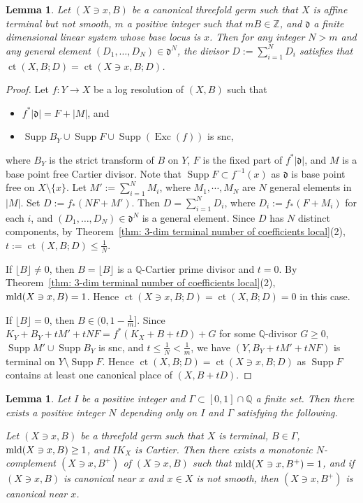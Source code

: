\documentclass[11pt]{amsart}
\numberwithin{equation}{section}
\newcommand{\Qq}{\mathbb{Q}}
\newcommand{\Zz}{\mathbb{Z}}
\newcommand{\Exc}{\operatorname{Exc}}
\newcommand{\mld}{{\rm{mld}}}
\newcommand{\ct}{\operatorname{ct}}
\newcommand{\Supp}{\operatorname{Supp}}
\newcommand{\Ii}{{\Gamma}}
\newtheorem{lem}[thm]{Lemma}
\theoremstyle{definition}
\theoremstyle{definition}
\begin{document}
\begin{lem}\label{lem: ct is attained by elephant at x}
Let $(X\ni x,B)$ be a canonical threefold germ such that $X$ is affine terminal but not smooth, $m$ a positive integer such that $mB\in \Zz$, and $\mathfrak{d}$ a finite dimensional linear system whose base locus is $x$. Then for any integer $N>m$ and any general element $(D_1,\dots,D_N)\in \mathfrak{d}^N$, the divisor $D:=\sum_{i=1}^N D_i$ satisfies that $\ct(X,B;D)=\ct(X\ni x, B;D)$.
\end{lem}

\begin{proof}
Let $f:Y\to X$ be a log resolution of $(X,B)$ such that
\begin{itemize}
    \item $f^{*}|{{\mathfrak {d}}}|=F+|M|$, and
    \item $\Supp B_Y\cup \Supp F\cup \Supp(\Exc(f))$ is snc,
\end{itemize}
where $B_Y$ is the strict transform of $B$ on $Y$, $F$ is the fixed part of $f^{*}|{{\mathfrak {d}}}|$, and $M$ is a base point free Cartier divisor. Note that $\Supp F\subset f^{-1}(x)$ as ${{\mathfrak {d}}}$ is base point free on $X\setminus\{x\}$. Let $M':=\sum_{i=1}^N M_i$, where $M_1,\cdots,M_N$ are $N$ general elements in $|M|$. Set $D:=f_{*}(NF+M')$. Then $D=\sum_{i=1}^N D_i$, where $D_i:=f_*(F+M_i)$ for each $i$, and $(D_1,\dots,D_N)\in \mathfrak{d}^N$ is a general element. Since $D$ has $N$ distinct components, by Theorem~\ref{thm: 3-dim terminal number of coefficients local}(2), $t:=\ct(X,B;D)\leq \frac{1}{N}$.

If $\lfloor B\rfloor\neq 0$, then $B=\lfloor B\rfloor$ is a $\Qq$-Cartier prime divisor and $t=0$. By Theorem~\ref{thm: 3-dim terminal number of coefficients local}(2), $\mld(X\ni x, B)=1$. Hence $\ct(X\ni x, B;D)=\ct(X,B;D)=0$ in this case.

If $\lfloor B\rfloor= 0$, then $B\in (0,1-\frac{1}{m}]$. Since $K_Y+B_Y+tM'+tNF=f^*(K_X+B+tD)+G$ for some $\Qq$-divisor $G\geq 0$, $\Supp M' \cup \Supp B_Y$ is snc, and $t\leq \frac{1}{N}<\frac{1}{m}$, we have $(Y,B_Y+tM'+tNF)$ is terminal on $Y\setminus\Supp F$. Hence $\ct(X,B;D)=\ct(X\ni x, B;D)$ as $\Supp F$ contains at least one canonical place of $(X,B+tD)$.
\end{proof}



\begin{lem}\label{lem: bounded index strict canonical complement}
Let $I$ be a positive integer and $\Gamma\subset [0,1]\cap \Qq$ a finite set. Then there exists a positive integer $N$ depending only on $I$ and $\Ii$ satisfying the following.

Let $(X\ni x,B)$ be a threefold germ such that $X$ is terminal, $B\in \Ii$, $\mld(X\ni x, B)\geq 1$, and $IK_X$ is Cartier. Then there exists a monotonic $N$-complement $(X\ni x, B^+)$ of $(X\ni x, B)$ such that $\mld(X\ni x, B^+)=1$, and if $(X\ni x,B)$ is canonical near $x$ and $x\in X$ is not smooth, then $(X\ni x, B^+)$ is canonical near $x$.
\end{lem}
\end{document}
